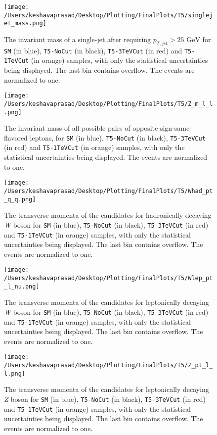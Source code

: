 \begin{figure}[!htb]
	\centering
	\texttt{[image: /Users/keshavaprasad/Desktop/Plotting/FinalPlots/T5/singlejet\_mass.png]}
	\caption{The invariant mass of a single-jet after requiring $p_{T,jet}>25 \text{ GeV}$ for \texttt{SM} (in blue), \texttt{T5-NoCut} (in black), \texttt{T5-3TeVCut} (in red) and \texttt{T5-1TeVCut} (in orange) samples, with only the statistical uncertainties being displayed. The last bin contains overflow. The events are normalized to one.}
	\label{T5Single Jet Mass -Post Cuts}
\end{figure}

\begin{figure}[!htb]%
	\centering
	\texttt{[image: /Users/keshavaprasad/Desktop/Plotting/FinalPlots/T5/Z\_m\_l\_l.png]}
	\caption{The invariant mass of all possible pairs of opposite-sign-same-flavored leptons, for \texttt{SM} (in blue), \texttt{T5-NoCut} (in black), \texttt{T5-3TeVCut} (in red) and \texttt{T5-1TeVCut} (in orange) samples, with only the statistical uncertainties being displayed. The events are normalized to one.}
	\label{T5-Z Candidate}
\end{figure}

\begin{figure}[!htb]
	\centering
	\texttt{[image: /Users/keshavaprasad/Desktop/Plotting/FinalPlots/T5/Whad\_pt\_q\_q.png]}
	\caption{The transverse momenta of the candidates for hadronically decaying \textit{W} boson for \texttt{SM} (in blue), \texttt{T5-NoCut} (in black), \texttt{T5-3TeVCut} (in red) and \texttt{T5-1TeVCut} (in orange) samples, with only the statistical uncertainties being displayed. The last bin contains overflow. The events are normalized to one.}
	\label{T5-Whad-pT}
\end{figure}

\begin{figure}[!htb]
	\centering
	\texttt{[image: /Users/keshavaprasad/Desktop/Plotting/FinalPlots/T5/Wlep\_pt\_l\_nu.png]}
	\caption{The transverse momenta of the candidates for leptonically decaying \textit{W} boson for \texttt{SM} (in blue), \texttt{T5-NoCut} (in black), \texttt{T5-3TeVCut} (in red) and \texttt{T5-1TeVCut} (in orange) samples, with only the statistical uncertainties being displayed. The last bin contains overflow. The events are normalized to one.}
	\label{T5-WLep-pT}
\end{figure}

\begin{figure}[!htb]
	\centering
	\texttt{[image: /Users/keshavaprasad/Desktop/Plotting/FinalPlots/T5/Z\_pt\_l\_l.png]}
	\caption{The transverse momenta of the candidates for leptonically decaying \textit{Z} boson for \texttt{SM} (in blue), \texttt{T5-NoCut} (in black), \texttt{T5-3TeVCut} (in red) and \texttt{T5-1TeVCut} (in orange) samples, with only the statistical uncertainties being displayed. The last bin contains overflow. The events are normalized to one.}
	\label{T5-ZlepleppT}
\end{figure}


